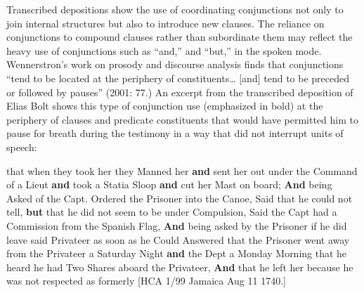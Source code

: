 Transcribed depositions show the use of coordinating conjunctions not only to join internal structures but also to introduce new clauses. The reliance on conjunctions to compound clauses rather than subordinate them may reflect the heavy use of conjunctions such as “and,” and “but,” in the spoken mode. Wennerstron’s work on prosody and discourse analysis  finds that conjunctions “tend to be located at the periphery of constituents… [and] tend to be preceded or followed by pauses” (2001: 77.) An excerpt from the transcribed deposition of Elias Bolt shows this type of conjunction use (emphasized in bold) at the periphery of clauses and predicate constituents that would have permitted him to pause for breath during the testimony in a way that did not interrupt units of speech:

that when they took her they Manned her \textbf{and} sent her out under the Command of a Lieut \textbf{and} took a Statia Sloop \textbf{and} cut her Mast on board; \textbf{And} being Asked of the Capt. Ordered the Prisoner into the Canoe, Said that he could not tell, \textbf{but} that he did not seem to be under Compulsion, Said the Capt had a Commission from the Spanish Flag, \textbf{And} being asked by the Prisoner if he did leave said Privateer as soon as he Could Answered that the Prisoner went away from the Privateer a Saturday Night \textbf{and} the Dept a Monday Morning that he heard he had Two Shares aboard the Privateer, \textbf{And} that he left her because he was not respected as formerly [HCA 1/99 Jamaica Aug 11 1740.]

